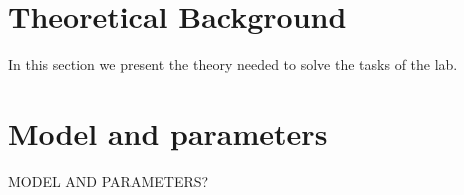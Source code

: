 \section{Theoretical Background}
In this section we present the theory needed to solve the tasks of the lab.


\newpage


\newpage


\newpage

\section{Model and parameters}

MODEL AND PARAMETERS?



